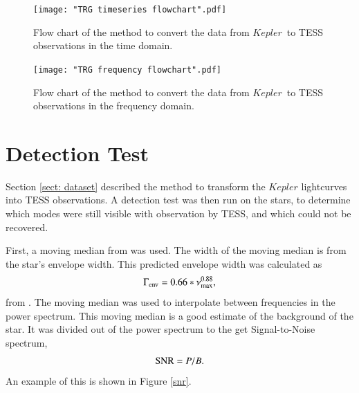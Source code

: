 \documentclass[a4paper,fleqn,usenatbib,useAMS]{mnras}
\newcommand{\numax}{\ensuremath{\nu_{\textrm{max}}}}
\newcommand{\kep}{\ensuremath{Kepler}}
\begin{document}
\onecolumn
\begin{figure}
	\centering
	\texttt{[image: "TRG timeseries flowchart".pdf]}
	\caption{Flow chart of the method to convert the data from \kep \ to TESS observations in the time domain.}	
	\label{ts flowchart}
\end{figure} 

\begin{figure}
	\centering
	\texttt{[image: "TRG frequency flowchart".pdf]}
	\caption{Flow chart of the method to convert the data from \kep \ to TESS observations in the frequency domain.}	
	\label{fr flowchart}
\end{figure}
\newpage
\twocolumn


\section{Detection Test}
\label{sect: det_test}

Section \ref{sect: dataset} described the method to transform the $Kepler$ lightcurves into TESS observations. A detection test was then run on the stars, to determine which modes were still visible with observation by TESS, and which could not be recovered.

First, a moving median from \citet{davies_asteroseismology_2016} was used. The width of the moving median is from the star's envelope width. This predicted envelope width was calculated as
\begin{equation}
\Gamma_{\rm env} = 0.66 * \numax^{0.88},
\end{equation}
from \citet{mosser_characterization_2012}. The moving median was used to interpolate between frequencies in the power spectrum. This moving median is a good estimate of the background of the star. It was divided out of the power spectrum to the get Signal-to-Noise spectrum,
\begin{equation}
\label{eq:snr}
{\rm SNR} = P/B.
\end{equation}
An example of this is shown in Figure \ref{snr}.
\end{document}
